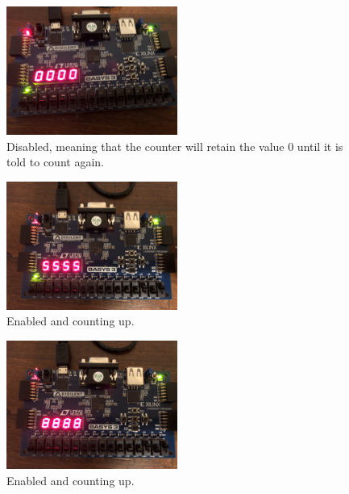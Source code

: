 \documentclass[11pt]{article}
\begin{document}
\begin{figure}[H]
\begin{center}
	\includegraphics[width=0.5\textwidth]{./images/p2/IMG_1007.jpg}
	\caption{\label{fig:advanced_counter_res1}Disabled, meaning that the counter will retain the value 0 until it is told to count again.}
\end{center}
\end{figure}

\begin{figure}[H]
\begin{center}
	\includegraphics[width=0.5\textwidth]{./images/p2/IMG_1008.jpg}
	\caption{\label{fig:advanced_counter_res2}Enabled and counting up.}
\end{center}
\end{figure}

\begin{figure}[H]
\begin{center}
	\includegraphics[width=0.5\textwidth]{./images/p2/IMG_1009.jpg}
	\caption{\label{fig:advanced_counter_res3}Enabled and counting up.}
\end{center}
\end{figure}
\end{document}
